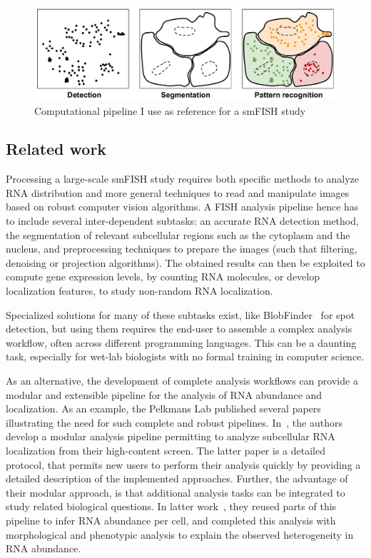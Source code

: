 \begin{figure}[]
    \centering
    \includegraphics[width=\textwidth]{figures/chapter1/schema_pipeline}
    \caption[Computational pipeline for a smFISH study]{Computational pipeline I use as reference for a smFISH study}
    \label{fig:pipeline}
\end{figure}

\subsection{Related work}
\label{subsec:related_work_fishquant}

Processing a large-scale \ac{smFISH} study requires both specific methods to analyze \ac{RNA} distribution and more general techniques to read and manipulate images based on robust computer vision algorithms.
A \ac{FISH} analysis pipeline hence has to include several inter-dependent subtasks: an accurate \ac{RNA} detection method, the segmentation of relevant subcellular regions such as the cytoplasm and the nucleus, and preprocessing techniques to prepare the images (such that filtering, denoising or projection algorithms).
The obtained results can then be exploited to compute gene expression levels, by counting \ac{RNA} molecules, or develop localization features, to study non-random \ac{RNA} localization.

Specialized solutions for many of these subtasks exist, like BlobFinder~\cite{ALLALOU200958} for spot detection, but using them requires the end-user to assemble a complex analysis workflow, often across different programming languages.
This can be a daunting task, especially for wet-lab biologists with no formal training in computer science.

As an alternative, the development of complete analysis workflows can provide a modular and extensible pipeline for the analysis of \ac{RNA} abundance and localization.
As an example, the Pelkmans Lab published several papers illustrating the need for such complete and robust pipelines.
In~\cite{battich_image-based_2013, stoeger_computer_2015}, the authors develop a modular analysis pipeline permitting to analyze subcellular \ac{RNA} localization from their high-content screen.
The latter paper is a detailed protocol, that permits new users to perform their analysis quickly by providing a detailed description of the implemented approaches.
Further, the advantage of their modular approach, is that additional analysis tasks can be integrated to study related biological questions.
In latter work~\cite{battich_control_2015}, they reused parts of this pipeline to infer \ac{RNA} abundance per cell, and completed this analysis with morphological and phenotypic analysis to explain the observed heterogeneity in \ac{RNA} abundance.

